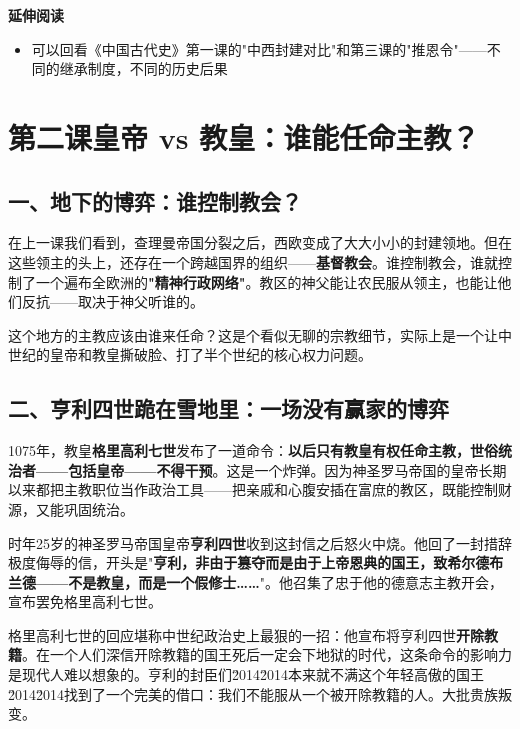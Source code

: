 \documentclass[a4paper,12pt]{ctexart}
\begin{document}
\vspace{0.3cm}
\textcolor{blue!70!black}{\textbf{延伸阅读}}
\begin{itemize}
  \item 可以回看《中国古代史》第一课的"中西封建对比"和第三课的"推恩令"——不同的继承制度，不同的历史后果
\end{itemize}

\newpage

\section{\textcolor{orange!80!black}{第二课\quad 皇帝 vs 教皇：谁能任命主教？}}

\subsection*{一、地下的博弈：谁控制教会？}

在上一课我们看到，查理曼帝国分裂之后，西欧变成了大大小小的封建领地。但在这些领主的头上，还存在一个跨越国界的组织——\textbf{基督教会}。谁控制教会，谁就控制了一个遍布全欧洲的\:\textbf{"精神行政网络"}。教区的神父能让农民服从领主，也能让他们反抗——取决于神父听谁的。

这个地方的主教应该由谁来任命？这是个看似无聊的宗教细节，实际上是一个让中世纪的皇帝和教皇撕破脸、打了半个世纪的核心权力问题。

\subsection*{二、亨利四世跪在雪地里：一场没有赢家的博弈}

1075年，教皇\textbf{格里高利七世}发布了一道命令：\textbf{以后只有教皇有权任命主教，世俗统治者——包括皇帝——不得干预}。这是一个炸弹。因为神圣罗马帝国的皇帝长期以来都把主教职位当作政治工具——把亲戚和心腹安插在富庶的教区，既能控制财源，又能巩固统治。

时年25岁的神圣罗马帝国皇帝\textbf{亨利四世}收到这封信之后怒火中烧。他回了一封措辞极度侮辱的信，开头是"\textbf{亨利，非由于篡夺而是由于上帝恩典的国王，致希尔德布兰德——不是教皇，而是一个假修士……}"。他召集了忠于他的德意志主教开会，宣布罢免格里高利七世。

格里高利七世的回应堪称中世纪政治史上最狠的一招：他宣布将亨利四世\textbf{开除教籍}。在一个人们深信开除教籍的国王死后一定会下地狱的时代，这条命令的影响力是现代人难以想象的。亨利的封臣们\u2014\u2014本来就不满这个年轻高傲的国王\u2014\u2014找到了一个完美的借口：我们不能服从一个被开除教籍的人。大批贵族叛变。
\end{document}
